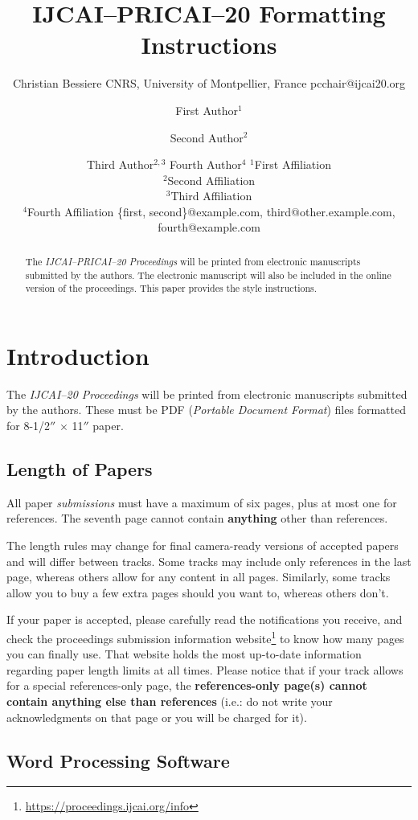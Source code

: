 \documentclass{article}
\title{IJCAI--PRICAI--20 Formatting Instructions}
\author{
    Christian Bessiere
    \affiliations
    CNRS, University of Montpellier, France
    \emails
    pcchair@ijcai20.org
}
\author{
First Author$^1$
\and
Second Author$^2$\and
Third Author$^{2,3}$\And
Fourth Author$^4$
\affiliations
$^1$First Affiliation\\
$^2$Second Affiliation\\
$^3$Third Affiliation\\
$^4$Fourth Affiliation
\emails
\{first, second\}@example.com,
third@other.example.com,
fourth@example.com
}
\begin{document}
\maketitle

\begin{abstract}
  The {\it IJCAI--PRICAI--20 Proceedings} will be printed from electronic
  manuscripts submitted by the authors. The electronic manuscript will
  also be included in the online version of the proceedings. This paper
  provides the style instructions.
\end{abstract}

\section{Introduction}

The {\it IJCAI--20 Proceedings} will be printed from electronic
manuscripts submitted by the authors. These must be PDF ({\em Portable
Document Format}) files formatted for 8-1/2$''$ $\times$ 11$''$ paper.

\subsection{Length of Papers}

All paper {\em submissions} must have a maximum of six pages, plus at most one for references. The seventh page cannot contain {\bf anything} other than references.

The length rules may change for final camera-ready versions of accepted papers and will differ between tracks. Some tracks may include only references in the last page, whereas others allow for any content in all pages. Similarly, some tracks allow you to buy a few extra pages should you want to, whereas others don't.

If your paper is accepted, please carefully read the notifications you receive, and check the proceedings submission information website\footnote{\url{https://proceedings.ijcai.org/info}} to know how many pages you can finally use. That website holds the most up-to-date information regarding paper length limits at all times. Please notice that if your track allows for a special references-only page, the {\bf references-only page(s) cannot contain anything else than references} (i.e.: do not write your acknowledgments on that page or you will be charged for it).

\subsection{Word Processing Software}
\end{document}
